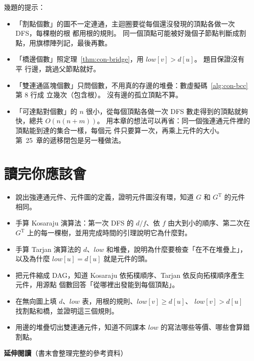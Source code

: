 幾題的提示：

\begin{itemize}
\item 「割點個數」的圖不一定連通，主迴圈要從每個還沒發現的頂點各做一次 DFS，每棵樹的根
都用根的規則。 同一個頂點可能被好幾個子節點判斷成割點，用旗標陣列記，最後再數。
\item 「橋邊個數」照定理~\ref{thm:con-bridge}，用 $\mathit{low}[v] > d[u]$。 題目保證沒有平
行邊，跳過父節點就好。
\item 「雙連通區塊個數」只問個數，不用真的存邊的堆疊：數虛擬碼~\ref{alg:con-bcc} 第 8 行成
立幾次（包含根）。 沒有邊的孤立頂點不算。
\item 「可達點對個數」的 $n$ 很小，從每個頂點各做一次 DFS 數走得到的頂點就夠快，總共
$O(n(n + m))$。 用本章的想法可以再省：同一個強連通元件裡的頂點能到達的集合一樣，每個元
件只要算一次，再乘上元件的大小。 第~25~章的遞移閉包是另一種做法。
\end{itemize}

\section{讀完你應該會}
\label{sec:con-checklist}

\begin{itemize}
\item 說出強連通元件、元件圖的定義，證明元件圖沒有環，知道 $G$ 和 $G^{\mathrm{T}}$ 的元件
相同。
\item 手算 Kosaraju 演算法：第一次 DFS 的 $d/f$、依 $f$ 由大到小的順序、第二次在
$G^{\mathrm{T}}$ 上的每一棵樹，並用完成時間的引理說明它為什麼對。
\item 手算 Tarjan 演算法的 $d$、$\mathit{low}$ 和堆疊，說明為什麼要檢查「在不在堆疊上」，
以及為什麼 $\mathit{low}[u] = d[u]$ 就是元件的頭。
\item 把元件縮成 DAG，知道 Kosaraju 依拓樸順序、Tarjan 依反向拓樸順序產生元件，用源點
個數回答「從哪裡出發能到每個頂點」。
\item 在無向圖上填 $d$、$\mathit{low}$ 表，用根的規則、$\mathit{low}[v] \ge d[u]$、
$\mathit{low}[v] > d[u]$ 找割點和橋，並證明這三個規則。
\item 用邊的堆疊切出雙連通元件，知道不同課本 $\mathit{low}$ 的寫法哪些等價、哪些會算錯割點。
\end{itemize}

\textbf{延伸閱讀}（書末會整理完整的參考資料）

